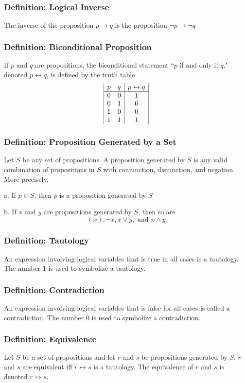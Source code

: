 \documentclass{article}
\begin{document}
\subsubsection*{Definition: Logical Inverse}
The inverse of the proposition $p \to q$ is the proposition $\neg p \to \neg q$

\subsubsection*{Definition: Biconditional Proposition}
If $p$ and $q$ are propositions, the biconditional statement ``$p$ if and only if $q$," denoted $p \leftrightarrow q$, is defined by the truth table
$$\begin{array}{|c c|c|}
p & q & p \leftrightarrow q \\
\hline
0 & 0 & 1\\
0 & 1 & 0\\
1 & 0 & 0\\
1 & 1 & 1\\
\end{array}$$

\subsubsection*{Definition: Proposition Generated by a Set}
Let $S$ be any set of propositions. A proposition generated by $S$ is any valid combination of propositions in $S$ with conjunction, disjunction, and negation. More precisely, 

a. If $p \in S$, then $p$ is a proposition generated by $S$

b. If $x$ and $y$ are propositions generated by $S$, then so are $$(x), \neg x, x \lor y,\text{ and }x \land y$$

\subsubsection*{Definition: Tautology}
An expression involving logical variables that is true in all cases is a tautology. The number $1$ is used to symbolize a tautology.

\subsubsection*{Definition: Contradiction}
An expression involving logical variables that is false for all cases is called a contradiction. The number $0$ is used to symbolize a contradiction. 

\subsubsection*{Definition: Equivalence}
Let $S$ be a set of propositions and let $r$ and $s$ be propositions generated by $S$. $r$ and $s$ are equivalent iff $r \leftrightarrow s$ is a tautology. The equivalence of $r$ and $s$ is denoted $r \iff s$.
\end{document}
